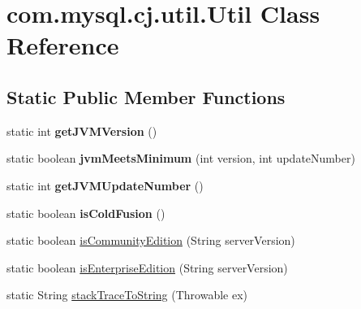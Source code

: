 \hypertarget{classcom_1_1mysql_1_1cj_1_1util_1_1_util}{}\section{com.\+mysql.\+cj.\+util.\+Util Class Reference}
\label{classcom_1_1mysql_1_1cj_1_1util_1_1_util}
\subsection*{Static Public Member Functions}
\begin{DoxyCompactItemize}
\item 
\mbox{\label{classcom_1_1mysql_1_1cj_1_1util_1_1_util_a8a0cafdd6a8954f0e9f56d53b20891f0}} 
static int {\bfseries get\+J\+V\+M\+Version} ()
\item 
\mbox{\label{classcom_1_1mysql_1_1cj_1_1util_1_1_util_a132de3963fbece2d0e5858f0b420f318}} 
static boolean {\bfseries jvm\+Meets\+Minimum} (int version, int update\+Number)
\item 
\mbox{\label{classcom_1_1mysql_1_1cj_1_1util_1_1_util_a34479078f5d6fd33e4b2ca262144ec25}} 
static int {\bfseries get\+J\+V\+M\+Update\+Number} ()
\item 
\mbox{\label{classcom_1_1mysql_1_1cj_1_1util_1_1_util_a6af100ac590976d34eef802f9511a22f}} 
static boolean {\bfseries is\+Cold\+Fusion} ()
\item 
static boolean \mbox{\hyperlink{classcom_1_1mysql_1_1cj_1_1util_1_1_util_ae6f8c91f805d5d3960a40c0a2892092e}{is\+Community\+Edition}} (String server\+Version)
\item 
static boolean \mbox{\hyperlink{classcom_1_1mysql_1_1cj_1_1util_1_1_util_a544537a70dee543f33219f1641be7c75}{is\+Enterprise\+Edition}} (String server\+Version)
\item 
static String \mbox{\hyperlink{classcom_1_1mysql_1_1cj_1_1util_1_1_util_af56476861014cdc8d214eb1440cfdf9e}{stack\+Trace\+To\+String}} (Throwable ex)
\item 
\mbox{\label{classcom_1_1mysql_1_1cj_1_1util_1_1_util_a2596886e40a0b168c30d81fe2777a583}} 

\end{DoxyCompactItemize}
